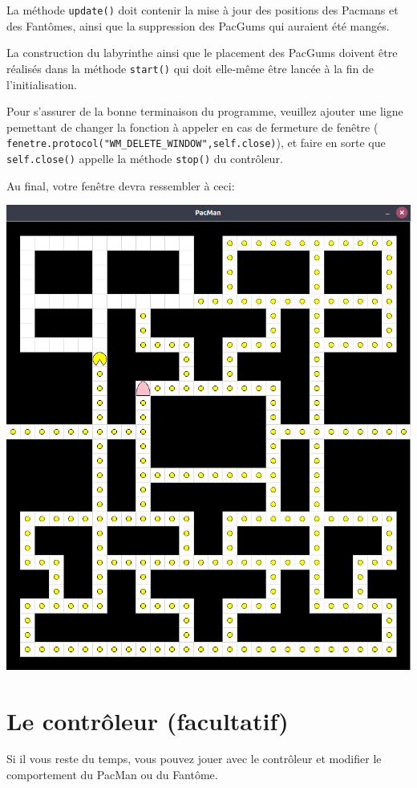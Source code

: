 \documentclass{article}
\begin{document}
\noindent
La méthode \verb~update()~ doit contenir la mise à jour des positions des Pacmans et des Fantômes, ainsi que la suppression des PacGums qui auraient été mangés.

\noindent
La construction du labyrinthe ainsi que le placement des PacGums doivent être réalisés dans la méthode \verb~start()~ qui doit elle-même être lancée à la fin de l'initialisation.

\noindent
Pour s'assurer de la bonne terminaison du programme, veuillez ajouter une ligne pemettant de changer la fonction à appeler en cas de fermeture de fenêtre ( \verb~fenetre.protocol("WM_DELETE_WINDOW",self.close)~), et faire en sorte que \verb~self.close()~ appelle la méthode \verb~stop()~ du contrôleur. 

Au final, votre fenêtre devra ressembler à ceci:

\begin{center}
\includegraphics[width=.5\linewidth]{./img/PacMan.png}
\end{center}

\section{Le contrôleur (facultatif)}
\label{sec-2}

Si il vous reste du temps, vous pouvez jouer avec le contrôleur et modifier le comportement du PacMan ou du Fantôme.
\end{document}
